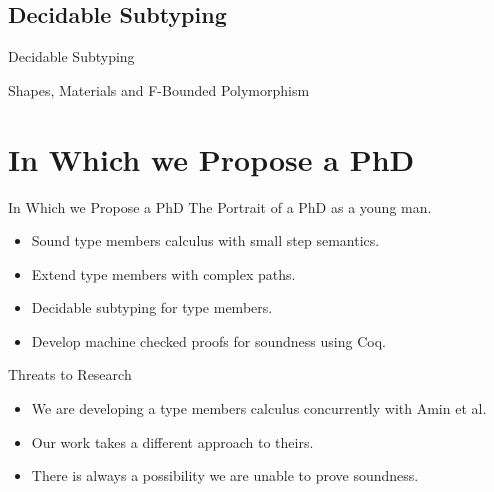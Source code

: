 \documentclass[dvipsnames]{beamer}
\begin{document}
\subsection{Decidable Subtyping}

\begin{frame}{Decidable Subtyping}
\end{frame}

\begin{frame}{Shapes, Materials and F-Bounded Polymorphism}
\end{frame}

\section{In Which we Propose a PhD}

\begin{frame}{In Which we Propose a PhD}
The Portrait of a PhD as a young man.
\begin{itemize}
\item
Sound type members calculus with small step semantics.
\item
Extend type members with complex paths.
\item
Decidable subtyping for type members.
\item
Develop machine checked proofs for soundness using Coq.
\end{itemize}
\end{frame}

\begin{frame}{Threats to Research}
\begin{itemize}
\item
We are developing a type members calculus concurrently with Amin et al.
\item
Our work takes a different approach to theirs.
\item
There is always a possibility we are unable to prove soundness.
\end{itemize}
\end{frame}
\end{document}
